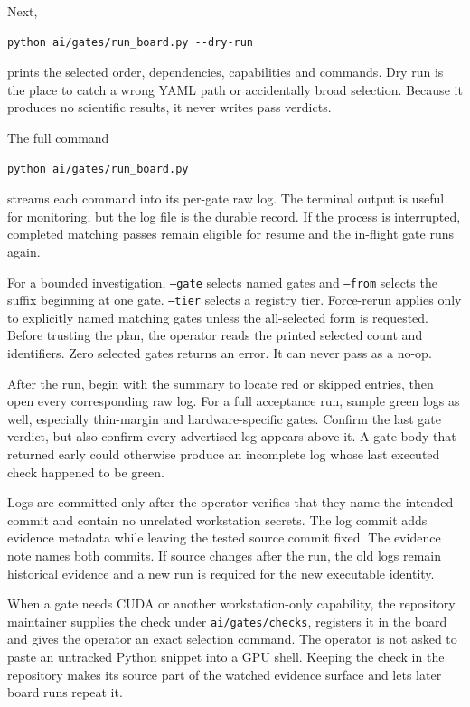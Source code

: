\documentclass[10pt,aps,prd,twocolumn,nofootinbib]{revtex4-2}
\newcommand{\code}[1]{\texttt{#1}}
\begin{document}
Next,
\begin{verbatim}
python ai/gates/run_board.py --dry-run
\end{verbatim}
prints the selected order, dependencies, capabilities and commands.  Dry run
is the place to catch a wrong YAML path or accidentally broad selection.
Because it produces no scientific results, it never writes pass verdicts.

The full command
\begin{verbatim}
python ai/gates/run_board.py
\end{verbatim}
streams each command into its per-gate raw log.  The terminal output is useful
for monitoring, but the log file is the durable record.  If the process is
interrupted, completed matching passes remain eligible for resume and the
in-flight gate runs again.

For a bounded investigation, \code{--gate} selects named gates and
\code{--from} selects the suffix beginning at one gate.  \code{--tier}
selects a registry tier.  Force-rerun applies only to explicitly named
matching gates unless the all-selected form is requested.  Before trusting
the plan, the operator reads the printed selected count and identifiers.  Zero
selected gates returns an error.  It can never pass as a no-op.

After the run, begin with the summary to locate red or skipped entries, then
open every corresponding raw log.  For a full acceptance run, sample green
logs as well, especially thin-margin and hardware-specific gates.  Confirm
the last gate verdict, but also confirm every advertised leg appears above it.
A gate body that returned early could otherwise produce an incomplete log
whose last executed check happened to be green.

Logs are committed only after the operator verifies that they name the
intended commit and contain no unrelated workstation secrets.  The log commit
adds evidence metadata while leaving the tested source commit fixed.  The
evidence note names both commits.  If source changes after the run, the old logs
remain historical evidence and a new run is required for the new executable
identity.

When a gate needs CUDA or another workstation-only capability, the repository
maintainer supplies the check under \code{ai/gates/checks}, registers it in the
board and gives the operator an exact selection command.  The operator is not
asked to paste an untracked Python snippet into a GPU shell.  Keeping the
check in the repository makes its source part of the watched evidence surface
and lets later board runs repeat it.
\end{document}
